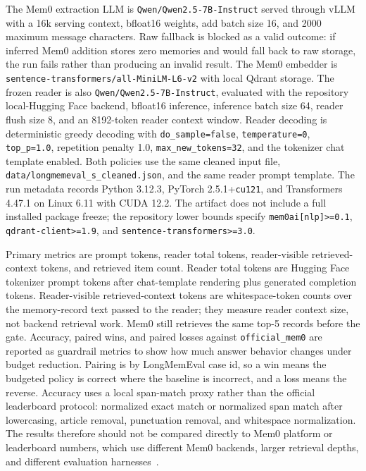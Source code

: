 \documentclass{article}
\begin{document}
The Mem0 extraction LLM is \texttt{Qwen/Qwen2.5-7B-Instruct} served through vLLM with a 16k serving context, bfloat16 weights, add batch size 16, and 2000 maximum message characters. Raw fallback is blocked as a valid outcome: if inferred Mem0 addition stores zero memories and would fall back to raw storage, the run fails rather than producing an invalid result. The Mem0 embedder is \texttt{sentence-transformers/all-MiniLM-L6-v2} with local Qdrant storage. The frozen reader is also \texttt{Qwen/Qwen2.5-7B-Instruct}, evaluated with the repository local-Hugging Face backend, bfloat16 inference, inference batch size 64, reader flush size 8, and an 8192-token reader context window. Reader decoding is deterministic greedy decoding with \texttt{do\_sample=false}, \texttt{temperature=0}, \texttt{top\_p=1.0}, repetition penalty 1.0, \texttt{max\_new\_tokens=32}, and the tokenizer chat template enabled. Both policies use the same cleaned input file, \texttt{data/longmemeval\_s\_cleaned.json}, and the same reader prompt template. The run metadata records Python 3.12.3, PyTorch 2.5.1+\texttt{cu121}, and Transformers 4.47.1 on Linux 6.11 with CUDA 12.2. The artifact does not include a full installed package freeze; the repository lower bounds specify \texttt{mem0ai[nlp]>=0.1}, \texttt{qdrant-client>=1.9}, and \texttt{sentence-transformers>=3.0}.

Primary metrics are prompt tokens, reader total tokens, reader-visible retrieved-context tokens, and retrieved item count. Reader total tokens are Hugging Face tokenizer prompt tokens after chat-template rendering plus generated completion tokens. Reader-visible retrieved-context tokens are whitespace-token counts over the memory-record text passed to the reader; they measure reader context size, not backend retrieval work. Mem0 still retrieves the same top-5 records before the gate. Accuracy, paired wins, and paired losses against \texttt{official\_mem0} are reported as guardrail metrics to show how much answer behavior changes under budget reduction. Pairing is by LongMemEval case id, so a win means the budgeted policy is correct where the baseline is incorrect, and a loss means the reverse. Accuracy uses a local span-match proxy rather than the official leaderboard protocol: normalized exact match or normalized span match after lowercasing, article removal, punctuation removal, and whitespace normalization. The results therefore should not be compared directly to Mem0 platform or leaderboard numbers, which use different Mem0 backends, larger retrieval depths, and different evaluation harnesses~\cite{mem0benchmarks2026}.
\end{document}
